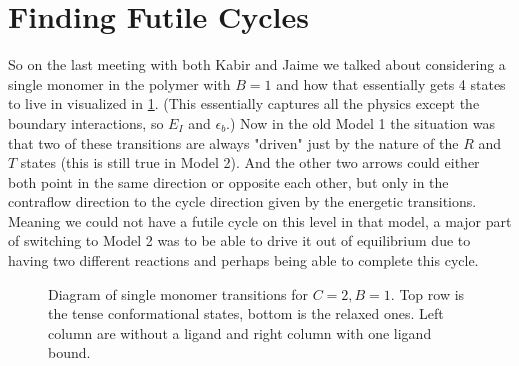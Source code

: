 \documentclass[11pt]{article}
\begin{document}
\section{Finding Futile Cycles}
So on the last meeting with both Kabir and Jaime we talked about considering a single monomer in the polymer with $B=1$ and how that essentially gets 4 states to live in visualized in \cref{fig:4states}.
(This essentially captures all the physics except the boundary interactions, so $E_I$ and $\epsilon_b$.)
Now in the old Model 1 the situation was that two of these transitions are always "driven" just by the nature of the $R$ and $T$ states (this is still true in Model 2).
And the other two arrows could either both point in the same direction or opposite each other, but only in the contraflow direction to the cycle direction given by the energetic transitions.
Meaning we could not have a futile cycle on this level in that model, a major part of switching to Model 2 was to be able to drive it out of equilibrium due to having two different reactions and perhaps being able to complete this cycle.

\begin{figure}[H]
    \centering
    \caption{
        Diagram of single monomer transitions for $C=2,B=1$.
        Top row is the tense conformational states, bottom is the relaxed ones.
        Left column are without a ligand and right column with one ligand bound.
    }\label{fig:4states}
\end{figure}
\end{document}
